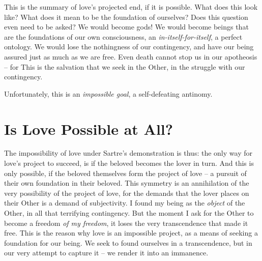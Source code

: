 This is the summary of love's projected end, if it is possible.  What does this look like? What does it mean to be the foundation of ourselves? Does this question even need to be asked? We would become gods! We would become beings that are the foundations of our own consciousness, an \emph{in-itself-for-itself}, a perfect ontology.  We would lose the nothingness of our contingency, and have our being assured just as much as we are free. Even death cannot stop us in our apotheosis -- for  This is the salvation that we seek in the Other, in the struggle with our contingency.

\noindent
Unfortunately, this is an \emph{impossible goal}, a self-defeating antinomy.

\section{Is Love Possible at All?}

The impossibility of love under Sartre's demonstration is thus: the only way for love's project to succeed, is if the beloved becomes the lover in turn. And this is only possible, if the beloved themselves form the project of love -- a pursuit of their own foundation in their beloved. This symmetry is an annihilation of the very possibility of the project of love, for the demands that the lover places on their Other is a demand of subjectivity. I found my being as the \emph{object} of the Other, in all that terrifying contingency. But the moment I ask for the Other to become a freedom \emph{of my freedom}, it loses the very transcendence that made it free.  This is the reason why love is an impossible project, as a means of seeking a foundation for our being. We seek to found ourselves in a transcendence, but in our very attempt to capture it -- we render it into an immanence. 

